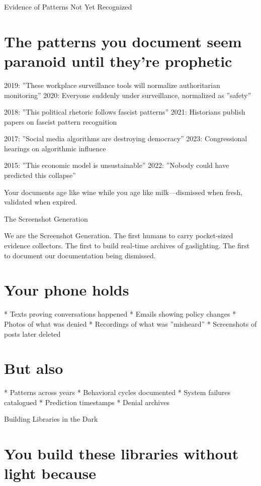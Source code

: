 \documentclass[12pt,oneside]{book}
\begin{document}
Evidence of Patterns Not Yet Recognized

\section{The patterns you document seem paranoid until they're prophetic}

2019: ''These workplace surveillance tools will normalize authoritarian monitoring'' 2020: Everyone suddenly under surveillance, normalized as ''safety''

2018: ''This political rhetoric follows fascist patterns'' 2021: Historians publish papers on fascist pattern recognition

2017: ''Social media algorithms are destroying democracy'' 2023: Congressional hearings on algorithmic influence

2015: ''This economic model is unsustainable'' 2022: ''Nobody could have predicted this collapse''

Your documents age like wine while you age like milk---dismissed when fresh, validated when expired.

The Screenshot Generation

We are the Screenshot Generation. The first humans to carry pocket-sized evidence collectors. The first to build real-time archives of gaslighting. The first to document our documentation being dismissed.

\section{Your phone holds}

                    * Texts proving conversations happened
                    * Emails showing policy changes
                    * Photos of what was denied
                    * Recordings of what was ''misheard''
                    * Screenshots of posts later deleted

\section{But also}

                    * Patterns across years
                    * Behavioral cycles documented
                    * System failures catalogued
                    * Prediction timestamps
                    * Denial archives

Building Libraries in the Dark

\section{You build these libraries without light because}
\end{document}
